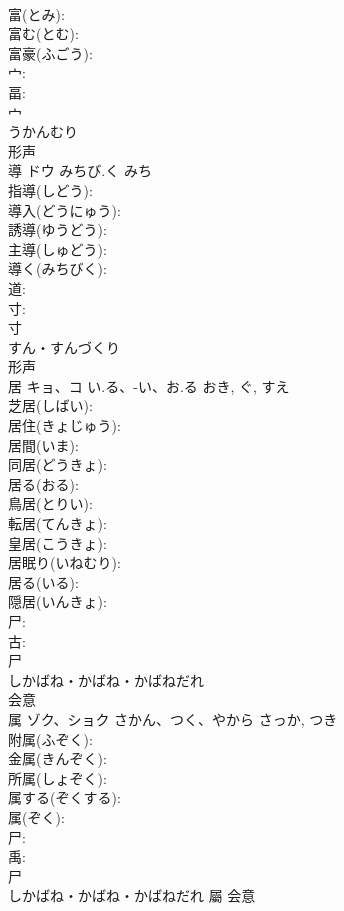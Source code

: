 \documentclass[8pt]{extreport}
\begin{document}
\begin{CJK}{UTF8}{min}
\\	富(とみ): 
\\	富む(とむ): 
\\	富豪(ふごう): 
\\	宀: 
\\	畐: 
\\	宀	
\\	うかんむり	
\\	形声 
\\	導	ドウ	みちび.く	みち	
\\	指導(しどう): 
\\	導入(どうにゅう): 
\\	誘導(ゆうどう): 
\\	主導(しゅどう): 
\\	導く(みちびく): 
\\	道: 
\\	寸: 
\\	寸	
\\	すん・すんづくり	
\\	形声 
\\	居	キョ、コ	い.る、-い、お.る	おき, ぐ, すえ	
\\	芝居(しばい): 
\\	居住(きょじゅう): 
\\	居間(いま): 
\\	同居(どうきょ): 
\\	居る(おる): 
\\	鳥居(とりい): 
\\	転居(てんきょ): 
\\	皇居(こうきょ): 
\\	居眠り(いねむり): 
\\	居る(いる): 
\\	隠居(いんきょ): 
\\	尸: 
\\	古: 
\\	尸	
\\	しかばね・かばね・かばねだれ	
\\	会意 
\\	属	ゾク、ショク	さかん、つく、やから	さっか, つき	
\\	附属(ふぞく): 
\\	金属(きんぞく): 
\\	所属(しょぞく): 
\\	属する(ぞくする): 
\\	属(ぞく): 
\\	尸: 
\\	禹: 
\\	尸	
\\	しかばね・かばね・かばねだれ	屬	会意 

\end{CJK}
\end{document}
